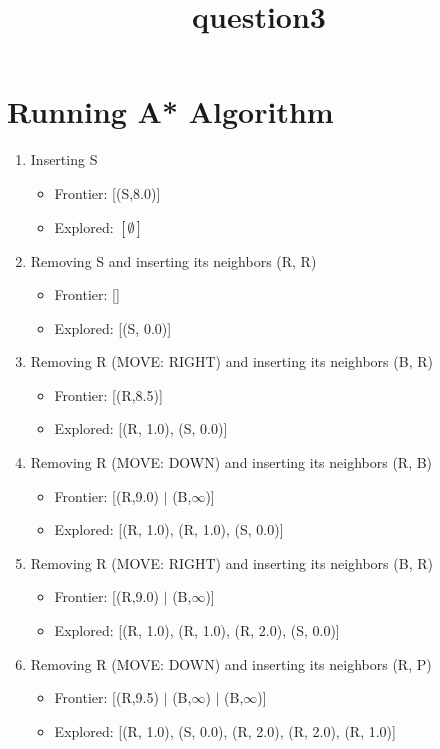 \documentclass[12pt]{article}
\begin{document}
\title{question3}
\maketitle
\section{Running A* Algorithm}
\begin{enumerate}
\item Inserting S
\begin{itemize}
\item Frontier: [(S,8.0)]
\item Explored: $[\emptyset]$
\end{itemize}

\item Removing S and inserting its neighbors (R, R)
\begin{itemize}
\item Frontier: []
\item Explored: [(S, 0.0)]
\end{itemize}

\item Removing R (MOVE: RIGHT) and inserting its neighbors (B, R)
\begin{itemize}
\item Frontier: [(R,8.5)]
\item Explored: [(R, 1.0), (S, 0.0)]
\end{itemize}

\item Removing R (MOVE: DOWN) and inserting its neighbors (R, B)
\begin{itemize}
\item Frontier: [(R,9.0) \(|\) (B,\(\infty\))]
\item Explored: [(R, 1.0), (R, 1.0), (S, 0.0)]
\end{itemize}

\item Removing R (MOVE: RIGHT) and inserting its neighbors (B, R)
\begin{itemize}
\item Frontier: [(R,9.0) \(|\) (B,\(\infty\))]
\item Explored: [(R, 1.0), (R, 1.0), (R, 2.0), (S, 0.0)]
\end{itemize}

\item Removing R (MOVE: DOWN) and inserting its neighbors (R, P)
\begin{itemize}
\item Frontier: [(R,9.5) \(|\) (B,\(\infty\)) \(|\) (B,\(\infty\))]
\item Explored: [(R, 1.0), (S, 0.0), (R, 2.0), (R, 2.0), (R, 1.0)]
\end{itemize}


\end{enumerate}
\end{document}
